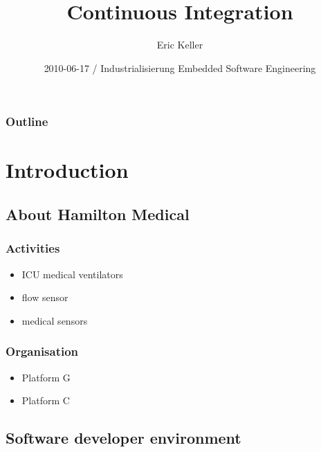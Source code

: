 \documentclass{beamer}
\title[CI]{Continuous Integration}
\author{Eric Keller}
\institute[HAMILTON-Medical AG]
{
HAMILTON-Medical AG\\
Platform C
}
\date{2010-06-17 / Industrialisierung Embedded Software Engineering}
\begin{document}
\begin{frame}
\titlepage
\end{frame}

\begin{frame}
\frametitle{Outline}
\tableofcontents
\end{frame}


\section{Introduction}

\subsection[Hamilton Medical]{About Hamilton Medical}

\begin{frame}
\frametitle{Activities}
\begin{itemize}
  \item ICU medical ventilators
  \item flow sensor
  \item medical sensors
\end{itemize}

\end{frame}

\begin{frame}
\frametitle{Organisation}

\begin{itemize}
  \item Platform G
  \item Platform C
\end{itemize}

\end{frame}

\subsection[developer environment]{Software developer environment}
\end{document}
